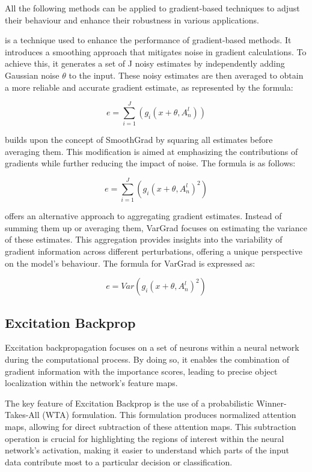All the following methods can be applied to gradient-based techniques to adjust their behaviour and enhance their robustness in various applications.

 \cite{smilkov2017smoothgrad} is a technique used to enhance the performance of gradient-based methods. It introduces a smoothing approach that mitigates noise in gradient calculations. To achieve this, it generates a set of J noisy estimates by independently adding Gaussian noise $\theta$ to the input. These noisy estimates are then averaged to obtain a more reliable and accurate gradient estimate, as represented by the formula:

$$ e = \sum_{i=1}^{J} (g_i(x+\theta,A^l_n))$$

 \cite{hooker2019benchmark} builds upon the concept of SmoothGrad by squaring all estimates before averaging them. This modification is aimed at emphasizing the contributions of gradients while further reducing the impact of noise. The formula is as follows:

$$ e = \sum_{i=1}^{J} (g_i(x+\theta,A^l_n)^2)$$


 \cite{adebayo2020sanity} offers an alternative approach to aggregating gradient estimates. Instead of summing them up or averaging them, VarGrad focuses on estimating the variance of these estimates. This aggregation provides insights into the variability of gradient information across different perturbations, offering a unique perspective on the model's behaviour. The formula for VarGrad is expressed as:

$$ e = Var(g_i(x+\theta,A^l_n)^2)$$



\subsection{Excitation Backprop \cite{zhang2018}}


Excitation backpropagation focuses on a set of neurons within a neural network during the computational process. By doing so, it enables the combination of gradient information with the importance scores, leading to precise object localization within the network's feature maps.

The key feature of Excitation Backprop is the use of a probabilistic Winner-Takes-All (WTA) formulation. This formulation produces normalized attention maps, allowing for direct subtraction of these attention maps. This subtraction operation is crucial for highlighting the regions of interest within the neural network's activation, making it easier to understand which parts of the input data contribute most to a particular decision or classification.

